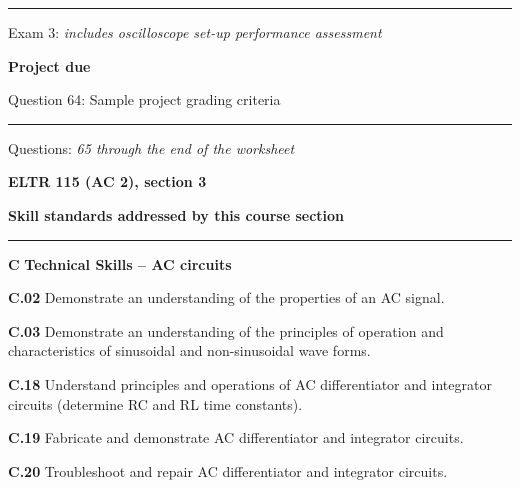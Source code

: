 \vskip 10pt
\hrule \vskip 5pt
\noindent
{}

\hskip 10pt Exam 3: {\it includes oscilloscope set-up performance assessment}

\hskip 10pt {\bf Project due}

\hskip 10pt Question 64: Sample project grading criteria
 
\vskip 10pt
\hrule \vskip 5pt
\noindent
{}

\hskip 10pt Questions: {\it 65 through the end of the worksheet}
 





\vfil \eject

\centerline{\bf ELTR 115 (AC 2), section 3} \bigskip 
 
\vskip 10pt

\noindent
{\bf Skill standards addressed by this course section}

\vskip 5pt

\hrule \vskip 10pt
\noindent
{}

\vskip 5pt

\medskip
\item{\bf C} {\bf Technical Skills -- AC circuits}
\item{\bf C.02} Demonstrate an understanding of the properties of an AC signal.
\item{\bf C.03} Demonstrate an understanding of the principles of operation and characteristics of sinusoidal and non-sinusoidal wave forms.
\item{\bf C.18} Understand principles and operations of AC differentiator and integrator circuits (determine RC and RL time constants).
\item{\bf C.19} Fabricate and demonstrate AC differentiator and integrator circuits.
\item{\bf C.20} Troubleshoot and repair AC differentiator and integrator circuits.
\medskip

\vskip 5pt

